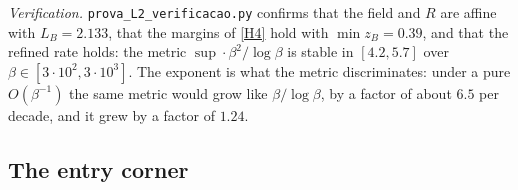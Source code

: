 \documentclass[11pt]{article}
\theoremstyle{definition}
\theoremstyle{remark}
\begin{document}
\noindent\emph{Verification.} \texttt{prova\_L2\_verificacao.py} confirms that the
field and $R$ are affine with $L_B=2.133$, that the margins of \eqref{H4} hold
with $\min z_B=0.39$, and that the refined rate holds: the metric
$\sup\cdot\beta^{2}/\log\beta$ is stable in $[4.2,5.7]$ over
$\beta\in[3\cdot10^2,3\cdot10^3]$. The exponent is what the metric discriminates:
under a pure $O(\beta^{-1})$ the same metric would grow like $\beta/\log\beta$,
by a factor of about $6.5$ per decade, and it grew by a factor of $1.24$.


\subsection{The entry corner}\label{app:L3}
\end{document}
